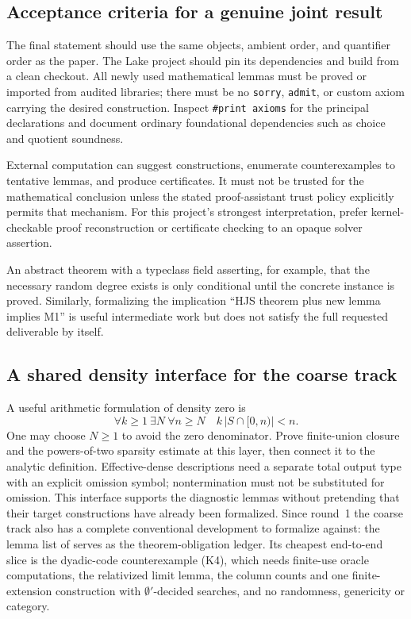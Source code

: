 \documentclass[11pt,a4paper]{article}
\theoremstyle{definition}\newtheorem{definition}[theorem]{Definition}
\theoremstyle{remark}\newtheorem{remark}[theorem]{Remark}
\begin{document}
\subsection{Acceptance criteria for a genuine joint result}

The final statement should use the same objects, ambient order, and quantifier order as the paper. The Lake project should pin its dependencies and build from a clean checkout. All newly used mathematical lemmas must be proved or imported from audited libraries; there must be no \texttt{sorry}, \texttt{admit}, or custom axiom carrying the desired construction. Inspect \texttt{\#print axioms} for the principal declarations and document ordinary foundational dependencies such as choice and quotient soundness.

External computation can suggest constructions, enumerate counterexamples to tentative lemmas, and produce certificates. It must not be trusted for the mathematical conclusion unless the stated proof-assistant trust policy explicitly permits that mechanism. For this project's strongest interpretation, prefer kernel-checkable proof reconstruction or certificate checking to an opaque solver assertion.

An abstract theorem with a typeclass field asserting, for example, that the necessary random degree exists is only conditional until the concrete instance is proved. Similarly, formalizing the implication ``HJS theorem plus new lemma implies M1'' is useful intermediate work but does not satisfy the full requested deliverable by itself.

\subsection{A shared density interface for the coarse track}
A useful arithmetic formulation of density zero is
\[
 \forall k\geq1\ \exists N\ \forall n\geq N\quad
              k\,|S\cap[0,n)|<n.
\]
One may choose $N\geq1$ to avoid the zero denominator. Prove finite-union closure and the powers-of-two sparsity estimate at this layer, then connect it to the analytic definition. Effective-dense descriptions need a separate total output type with an explicit omission symbol; nontermination must not be substituted for omission. This interface supports the diagnostic lemmas without pretending that their target constructions have already been formalized.\cite{ReportC} Since round~1 the coarse track also has a complete conventional development to formalize against: the lemma list of \cite{Synthesis} serves as the theorem-obligation ledger. Its cheapest end-to-end slice is the dyadic-code counterexample (K4), which needs finite-use oracle computations, the relativized limit lemma, the column counts and one finite-extension construction with $\emptyset'$-decided searches, and no randomness, genericity or category.
\end{document}
